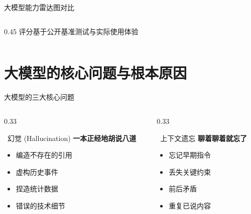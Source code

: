 \documentclass[aspectratio=169,11pt]{beamer}
\begin{document}
\begin{frame}{大模型能力雷达图对比}
\begin{columns}
\begin{column}{0.45\textwidth}
            \vspace{0.2cm}
            {\footnotesize 评分基于公开基准测试与实际使用体验}
        \end{column}
    \end{columns}
\end{frame}

\section{大模型的核心问题与根本原因}

\begin{frame}{大模型的三大核心问题}
    \begin{columns}
        \begin{column}{0.33\textwidth}
            \begin{alertblock}{\faExclamationTriangle\ 幻觉 (Hallucination)}
                \centering
                \vspace{0.2cm}
                \textbf{一本正经地胡说八道}
                \vspace{0.2cm}
                \begin{itemize}
                    \item 编造不存在的引用
                    \item 虚构历史事件
                    \item 捏造统计数据
                    \item 错误的技术细节
                \end{itemize}
            \end{alertblock}
        \end{column}
        \begin{column}{0.33\textwidth}
            \begin{alertblock}{\faMemory\ 上下文遗忘}
                \centering
                \vspace{0.2cm}
                \textbf{聊着聊着就忘了}
                \vspace{0.2cm}
                \begin{itemize}
                    \item 忘记早期指令
                    \item 丢失关键约束
                    \item 前后矛盾
                    \item 重复已说内容
                \end{itemize}

\end{alertblock}
\end{column}
\end{columns}
\end{frame}
\end{document}
